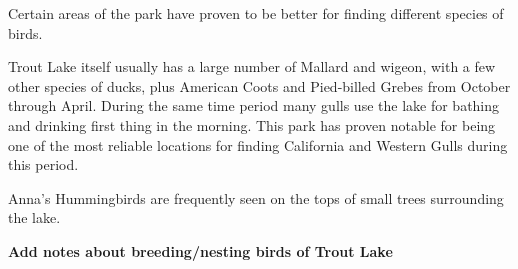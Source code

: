 Certain areas of the park have proven to be better for finding different species of birds. 

Trout Lake itself usually has a large number of Mallard and wigeon, with a few other species of ducks, plus American Coots and Pied-billed Grebes from October through April. During the same time period many gulls use the lake for bathing and drinking first thing in the morning. This park has proven notable for being one of the most reliable locations for finding California and Western Gulls during this period. 

Anna's Hummingbirds are frequently seen on the tops of small trees surrounding the lake.

\textbf{Add notes about breeding/nesting birds of Trout Lake}
